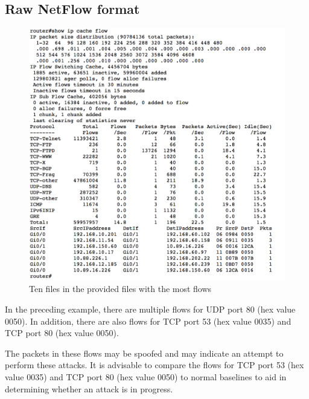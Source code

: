 \subsection{Raw NetFlow format}

\begin{figure}[h!]
\includegraphics[scale=0.5]{netflow_ddos}
\caption{Ten files in the provided files with the most flows}
\end{figure}

In the preceding example, there are multiple flows for UDP port 80 (hex value 0050). In addition, there are also flows for TCP port 53 (hex value 0035) and TCP port 80 (hex value 0050).

The packets in these flows may be spoofed and may indicate an attempt to perform these attacks. It is advisable to compare the flows for TCP port 53 (hex value 0035) and TCP port 80 (hex value 0050) to normal baselines to aid in determining whether an attack is in progress.





